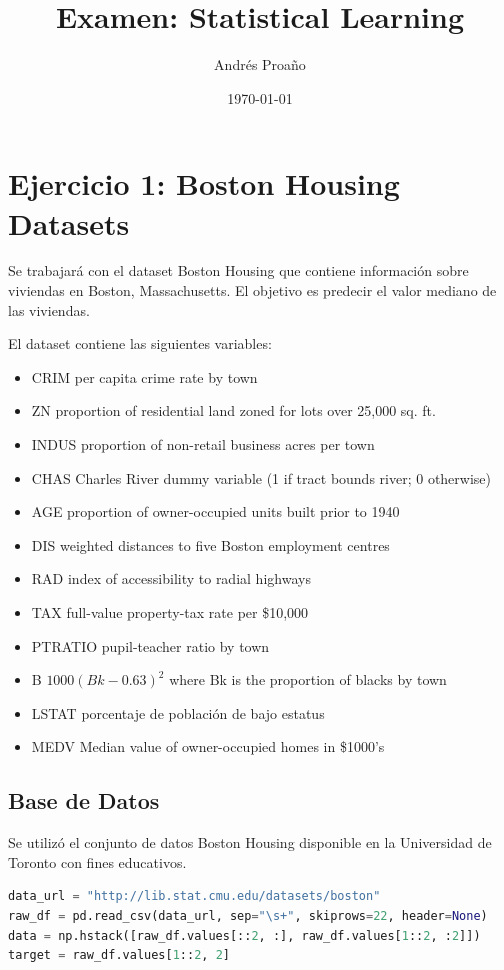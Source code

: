 \documentclass[12pt,a4paper]{article}
\title{\textbf{Examen: Statistical Learning}}
\author{Andrés Proaño}
\date{\today}
\begin{document}
\maketitle

\section{Ejercicio 1: Boston Housing Datasets}

Se trabajará con el dataset Boston Housing que contiene información sobre viviendas en Boston, Massachusetts. El objetivo es predecir el valor mediano de las viviendas.

El dataset contiene las siguientes variables:
\begin{itemize}
\item CRIM     per capita crime rate by town
\item ZN       proportion of residential land zoned for lots over 25,000 sq. ft.
\item INDUS    proportion of non-retail business acres per town
\item CHAS     Charles River dummy variable (1 if tract bounds river; 0 otherwise)
\item  AGE      proportion of owner-occupied units built prior to 1940
\item  DIS      weighted distances to five Boston employment centres
\item  RAD      index of accessibility to radial highways
\item  TAX      full-value property-tax rate per \$10,000
\item  PTRATIO  pupil-teacher ratio by town
\item  B        $1000(Bk - 0.63)^2$ where Bk is the proportion of blacks by town
\item  LSTAT    porcentaje de población de bajo estatus
\item  MEDV     Median value of owner-occupied homes in \$1000's
\end{itemize}

\subsection{Base de Datos}

Se utilizó el conjunto de datos Boston Housing disponible en la Universidad de Toronto con fines educativos.

\begin{lstlisting}[language=Python, frame=single, basicstyle=\ttfamily\small, breaklines=true]
data_url = "http://lib.stat.cmu.edu/datasets/boston"
raw_df = pd.read_csv(data_url, sep="\s+", skiprows=22, header=None)
data = np.hstack([raw_df.values[::2, :], raw_df.values[1::2, :2]])
target = raw_df.values[1::2, 2]
\end{lstlisting}
\end{document}
